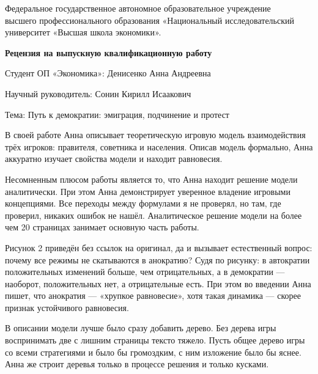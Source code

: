 \documentclass[a4paper, 12pt]{article}
\begin{document}
\begin{center}
{\small Федеральное государственное автономное образовательное учреждение\\ 
высшего профессионального образования «Национальный исследовательский\\ 
университет «Высшая школа экономики».}
\end{center}

\vspace{0.4cm}

\begin{center}
\textbf{Рецензия на выпускную квалификационную работу}
\end{center}

\vspace{0.4cm}

Студент ОП «Экономика»: Денисенко Анна Андреевна

\vspace{0.4cm}

Научный руководитель: Сонин Кирилл Исаакович

\vspace{0.4cm}

Тема: Путь к демократии: эмиграция, подчинение и протест

\vspace{1cm}

В своей работе Анна описывает теоретическую игровую модель
взаимодействия трёх игроков: правителя, советника и населения. Описав
модель формально, Анна аккуратно изучает свойства модели и находит
равновесия.

Несомненным плюсом работы является то, что Анна находит решение модели
аналитически. При этом Анна демонстрирует уверенное владение игровыми
концепциями. Все переходы между формулами я не проверял, но там, где
проверил, никаких ошибок не нашёл. Аналитическое решение модели на более
чем 20 страницах занимает основную часть работы.

Рисунок 2 приведён без ссылок на оригинал, да и вызывает естественный
вопрос: почему все режимы не скатываются в анократию? Судя по рисунку: в
автократии положительных изменений больше, чем отрицательных, а в
демократии --- наоборот, положительных нет, а отрицательные есть. При
этом во введении Анна пишет, что анократия --- «хрупкое равновесие»,
хотя такая динамика --- скорее признак устойчивого равновесия.

В описании модели лучше было сразу добавить дерево. Без дерева игры
воспринимать две с лишним страницы тексто тяжело. Пусть общее дерево
игры со всеми стратегиями и было бы громоздким, с ним изложение было бы
яснее. Анна же строит деревья только в процессе решения и только
кусками.
\end{document}
